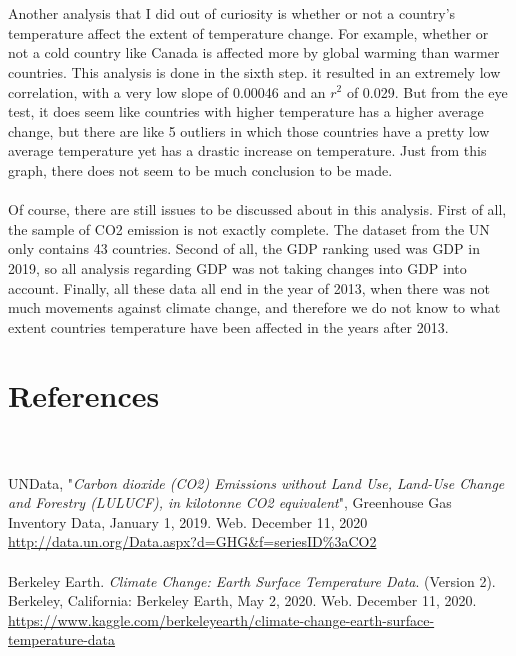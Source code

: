 \documentclass[fontsize=11pt]{article}
\begin{document}
\\\\ Another analysis that I did out of curiosity is whether or not a country's temperature affect the extent of temperature change. For example, whether or not a cold country like Canada is affected more by global warming than warmer countries. This analysis is done in the sixth step. it resulted in an extremely low correlation, with a very low slope of 0.00046 and an $r^2$ of 0.029. But from the eye test, it does seem like countries with higher temperature has a higher average change, but there are like 5 outliers in which those countries have a pretty low average temperature yet has a drastic increase on temperature. Just from this graph, there does not seem to be much conclusion to be made.
\\\\ Of course, there are still issues to be discussed about in this analysis. First of all, the sample of CO2 emission is not exactly complete. The dataset from the UN only contains 43 countries. Second of all, the GDP ranking used was GDP in 2019, so all analysis regarding GDP was not taking changes into GDP into account. Finally, all these data all end in the year of 2013, when there was not much movements against climate change, and therefore we do not know to what extent countries temperature have been affected in the years after 2013.

\section*{References}
\\\\
UNData, "\emph{Carbon dioxide (CO2) Emissions without Land Use, Land-Use Change and Forestry (LULUCF), in kilotonne CO2 equivalent}", Greenhouse Gas Inventory Data, January 1, 2019. Web. December 11, 2020  \\  \href{http://data.un.org/Data.aspx?d=GHG&f=seriesID\%3aCO2}{http://data.un.org/Data.aspx?d=GHG&f=seriesID\%3aCO2}\\\\

Berkeley Earth. \emph{Climate Change: Earth Surface Temperature Data}. (Version 2). Berkeley, California: Berkeley Earth, May 2, 2020. Web. December 11, 2020. \\
\href{https://www.kaggle.com/berkeleyearth/climate-change-earth-surface-temperature-data}{https://www.kaggle.com/berkeleyearth/climate-change-earth-surface-temperature-data} \\
\end{document}
